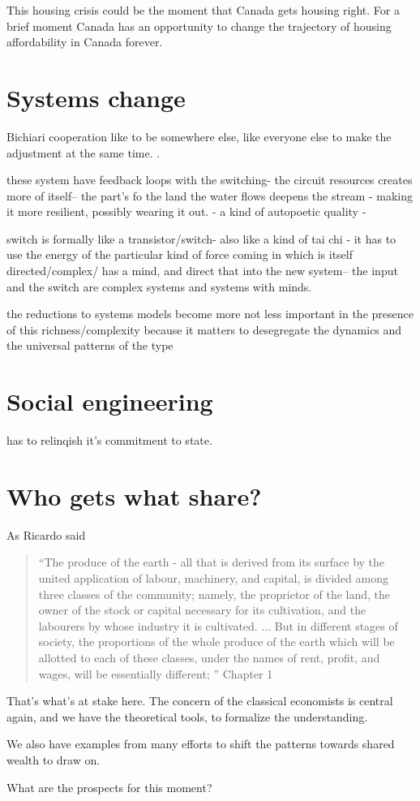 This housing crisis could be the moment that Canada gets housing right. For a brief moment Canada has an opportunity to change the trajectory of housing affordability in Canada forever.


\section{Systems change}


Bichiari cooperation
like to be somewhere else, like everyone else to make the adjustment at the same time. .

these system have feedback loops with the switching- the circuit resources creates more of itself-- the part's fo the land the water flows deepens the stream - making it more resilient, possibly wearing it out. - a kind of autopoetic quality -

switch is formally like a transistor/switch- also like a kind of tai chi - it has to use the energy of the particular kind of force coming in which is itself directed/complex/ has a mind, and direct that into the new system-- the input and the switch are complex systems and systems with minds.


the reductions to systems models become more not less important in the presence of this richness/complexity because it matters to desegregate the dynamics and the universal patterns of the type


\section{Social engineering}

has to relinqish it's commitment to state. 


\section{Who gets what share?}

As Ricardo said
\begin{quotation}   
 “The produce of the earth - all that is derived from its surface by the united application of labour, machinery, and capital, is divided among three classes of the community; namely, the proprietor of the land, the owner of the stock or capital necessary for its cultivation, and the labourers by whose industry it is cultivated. ...  But in different stages of society, the proportions of the whole produce of the earth which will be allotted to each of these classes, under the names of rent, profit, and wages, will be essentially different; ”  Chapter 1
\end{quotation}


That's what's at stake here.
The concern of the classical economists is central again, and we have the theoretical tools, to formalize the understanding.

We also have examples from many efforts to shift the patterns towards shared wealth to draw on. 

What are the prospects for this moment?